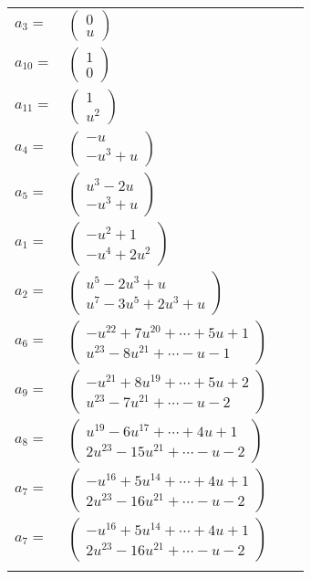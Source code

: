 \documentclass[1p]{elsarticle_modified}
\theoremstyle{definition}
\begin{document}
\begin{tabular}{m{7pt} m{180pt} m{7pt} m{180pt} }
\flushright $a_{3}=$&$\begin{pmatrix}0\\u\end{pmatrix}$ \\
\flushright $a_{10}=$&$\begin{pmatrix}1\\0\end{pmatrix}$ \\
\flushright $a_{11}=$&$\begin{pmatrix}1\\u^2\end{pmatrix}$ \\
\flushright $a_{4}=$&$\begin{pmatrix}- u\\- u^3+u\end{pmatrix}$ \\
\flushright $a_{5}=$&$\begin{pmatrix}u^3-2 u\\- u^3+u\end{pmatrix}$ \\
\flushright $a_{1}=$&$\begin{pmatrix}- u^2+1\\- u^4+2 u^2\end{pmatrix}$ \\
\flushright $a_{2}=$&$\begin{pmatrix}u^5-2 u^3+u\\u^7-3 u^5+2 u^3+u\end{pmatrix}$ \\
\flushright $a_{6}=$&$\begin{pmatrix}- u^{22}+7 u^{20}+\cdots+5 u+1\\u^{23}-8 u^{21}+\cdots- u-1\end{pmatrix}$ \\
\flushright $a_{9}=$&$\begin{pmatrix}- u^{21}+8 u^{19}+\cdots+5 u+2\\u^{23}-7 u^{21}+\cdots- u-2\end{pmatrix}$ \\
\flushright $a_{8}=$&$\begin{pmatrix}u^{19}-6 u^{17}+\cdots+4 u+1\\2 u^{23}-15 u^{21}+\cdots- u-2\end{pmatrix}$ \\
\flushright $a_{7}=$&$\begin{pmatrix}- u^{16}+5 u^{14}+\cdots+4 u+1\\2 u^{23}-16 u^{21}+\cdots- u-2\end{pmatrix}$\\ \flushright $a_{7}=$&$\begin{pmatrix}- u^{16}+5 u^{14}+\cdots+4 u+1\\2 u^{23}-16 u^{21}+\cdots- u-2\end{pmatrix}$\\&\end{tabular}
\end{document}
